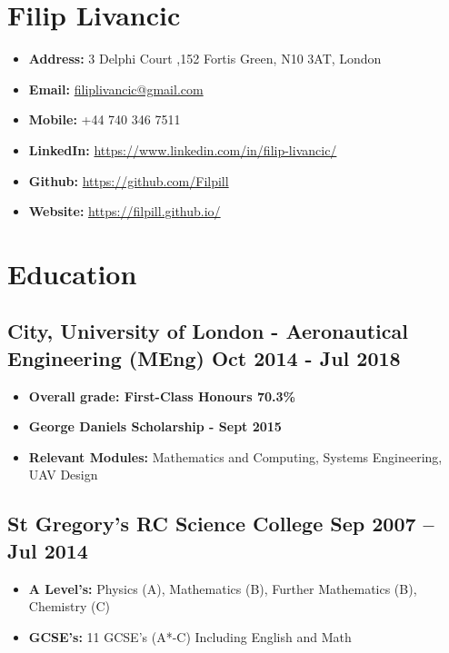 \documentclass[a4paper,9pt]{article}
\date{}
\begin{document}
\section*{Filip Livancic}

\begin{itemize}[noitemsep]
    \item\textbf{Address: }3 Delphi Court ,152 Fortis Green, N10 3AT, London
    \item\textbf{Email: }\href{mailto:filiplivancic@gmail.com}{filiplivancic@gmail.com}
    \item\textbf{Mobile: }+44 740 346 7511
    \item\textbf{LinkedIn: }\url{https://www.linkedin.com/in/filip-livancic/}
    \item\textbf{Github: }\url{https://github.com/Filpill}
    \item\textbf{Website: }\url{https://filpill.github.io/}
\end{itemize}


\section*{Education}
\subsection*{\textbf {City, University of London - Aeronautical Engineering (MEng)}  \hfill Oct 2014 - Jul 2018}\FloatBarrier
\begin{itemize}[noitemsep]
\item \textbf{Overall grade: First-Class Honours 70.3\%}
\item \textbf{George Daniels Scholarship - Sept 2015}
\item \textbf{Relevant Modules:} Mathematics and Computing, Systems Engineering, UAV Design
\end{itemize}


\subsection*{\textbf{St Gregory’s RC Science College} \hfill  Sep 2007 – Jul 2014}
\begin{itemize}[noitemsep]
    \item \textbf{A Level's:} Physics (A), Mathematics (B), Further Mathematics (B), Chemistry (C)
    \item \textbf{GCSE’s:} 11 GCSE’s (A*-C) Including English and Math
\end{itemize}
\end{document}
